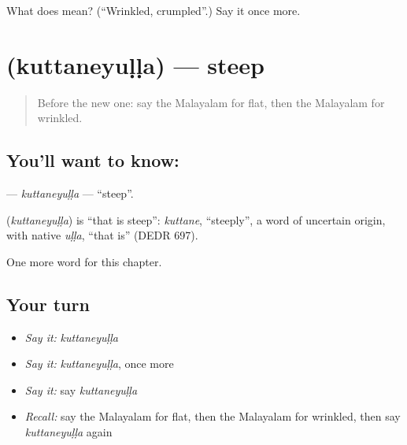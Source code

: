 \begin{tcolorbox}[breakable,colback=teal!4,colframe=teal!35!black,title={Before you move on}]
What does  mean? (\textquotedblleft{}Wrinkled, crumpled\textquotedblright{}.) Say it once more.
\end{tcolorbox}
\section[\texorpdfstring{\ml{കുത്തനെയുള്ള} (kuttaneyuḷḷa)}{കുത്തനെയുള്ള (kuttaneyuḷḷa)}]{ (kuttaneyuḷḷa) — steep}

\label{lesson:ML-C285-kuttaneyulla}



\begin{quote}
Before the new one: say the Malayalam for flat, then the Malayalam for wrinkled.
\end{quote}

\subsection*{You'll want to know: }
\textbf{} — \emph{kuttaneyuḷḷa} — \textquotedblleft{}steep\textquotedblright{}.

\begin{cousinweb}
\textbf{} (\emph{kuttaneyuḷḷa}) is \textquotedblleft{}that is steep\textquotedblright{}: \emph{kuttane}, \textquotedblleft{}steeply\textquotedblright{}, a word of uncertain origin, with native \emph{uḷḷa}, \textquotedblleft{}that is\textquotedblright{} (DEDR 697).
\end{cousinweb}

\begin{grammarlens}[title={What you've built}]
One more word for this chapter.
\end{grammarlens}

\subsection*{Your turn}
\begin{itemize}
\raggedright
  \item \emph{Say it:} \emph{kuttaneyuḷḷa}
  \item \emph{Say it:} \emph{kuttaneyuḷḷa}, once more
  \item \emph{Say it:} say \emph{kuttaneyuḷḷa}
  \item \emph{Recall:} say the Malayalam for flat, then the Malayalam for wrinkled, then say \emph{kuttaneyuḷḷa} again
\end{itemize}

